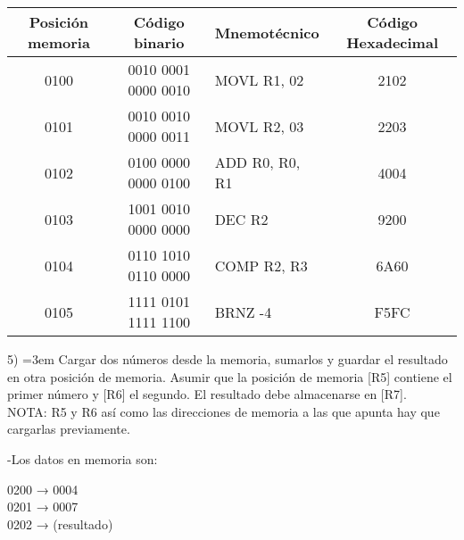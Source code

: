 \documentclass[a4paper,12pt]{article}
\begin{document}
	\vspace{0.5cm}
	
	\begin{tabular}{c|c|l|c}
		\textbf{Posición memoria} & \textbf{Código binario} & \textbf{Mnemotécnico} & \textbf{Código Hexadecimal}\\
		\hline
		0100 & 0010 0001 0000 0010 & MOVL R1, 02 & 2102 \\
		0101 & 0010 0010 0000 0011 & MOVL R2, 03 & 2203 \\
		0102 & 0100 0000 0000 0100 & ADD R0, R0, R1 & 4004 \\
		0103 & 1001 0010 0000 0000 & DEC R2 & 9200 \\
		0104 & 0110 1010 0110 0000 & COMP R2, R3 & 6A60 \\
		0105 & 1111 0101 1111 1100 & BRNZ -4 & F5FC \\
	\end{tabular}

	\vspace{0.8cm}
	
	5) \hangindent=3em Cargar dos números desde la memoria, sumarlos y guardar el resultado en otra
	posición de memoria. Asumir que la posición de memoria [R5] contiene el primer
	número y [R6] el segundo. El resultado debe almacenarse en [R7].\\
	NOTA: R5 y R6 así como las direcciones de memoria a las que apunta hay que cargarlas
	previamente.
	
	\vspace{0.5cm}
	
	\hspace{1cm}-Los datos en memoria son:
	\begin{flushleft}
		\hspace*{3cm}0200 → 0004 \\
		\hspace*{3cm}0201 → 0007 \\
		\hspace*{3cm}0202 → (resultado) \\
	\end{flushleft}

		\vspace{0.2cm}
	
\end{document}
